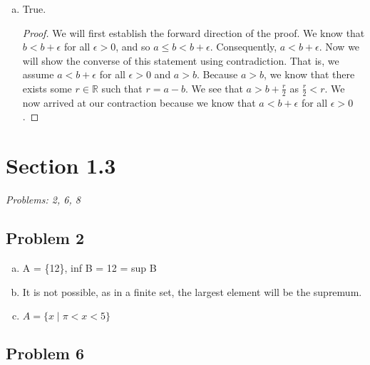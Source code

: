 \documentclass[12pt]{article}
\begin{document}
\begin{enumerate}[c).]
    \item {
    True. 
    \begin{proof}
        We will first establish the forward direction of the proof. 
        We know that $b < b + \epsilon$ for all $\epsilon > 0$, and so $a \le b < b + \epsilon$. 
        Consequently, $a < b + \epsilon$. 
        Now we will show the converse of this statement using contradiction. 
        That is, we assume $a < b + \epsilon$ for all $\epsilon > 0$ and $a>b$. 
        Because $a > b$, we know that there exists some $r \in \mathbb{R}$ such that $r = a - b$. 
        We see that $a > b + \frac{r}{2}$ as $\frac{r}{2} < r$.
        We now arrived at our contraction because we know that $a < b + \epsilon$ for all $\epsilon > 0$.
    \end{proof}
    }
\end{enumerate}


\vspace*{1cm}


\section*{Section 1.3}
\textit{Problems: 2, 6, 8}

\subsection*{Problem 2}
\begin{enumerate}[a).]
    \item {
    A = \{12\}, inf B = 12 = sup B
    }
    \item {
    It is not possible, as in a finite set, the largest element will be the supremum. 
    }
    \item {
    $A = \{ x \; \vert \; \pi < x < 5 \}$
    }
\end{enumerate}

\subsection*{Problem 6}
\end{document}
